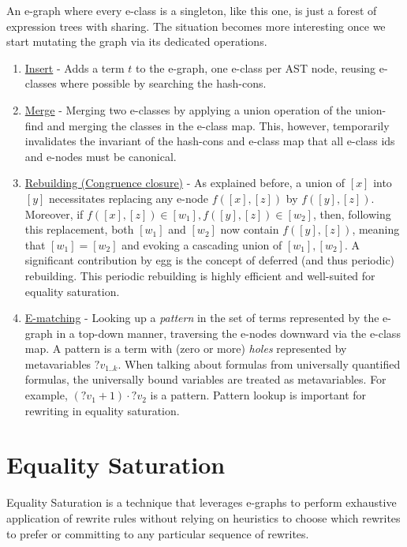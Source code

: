 An e-graph where every e-class is a singleton, like this one, is just a forest of expression trees with sharing.
The situation becomes more interesting once we start mutating the graph via its dedicated operations.

\begin{enumerate}
\item \underline{Insert} - Adds a term $t$ to the e-graph, one e-class per AST node, reusing e-classes where possible by searching the hash-cons.
\item \underline{Merge} - Merging two e-classes by applying a union operation of the union-find and merging the classes in the e-class map.
This, however, temporarily invalidates the invariant of the hash-cons and e-class map that all e-class ids and e-nodes must be canonical.
\item \underline{Rebuilding (Congruence closure)} - As explained before, a union of $[x]$ into $[y]$ necessitates replacing any e-node $f([x],[z])$ by $f([y],[z])$.
Moreover, if $f([x],[z])\in[w_1], f([y],[z])\in[w_2]$,
then, following this replacement, both $[w_1]$ and $[w_2]$ now contain
$f([y],[z])$, meaning that $[w_1] = [w_2]$ and evoking a cascading union of $[w_1], [w_2]$.
A significant contribution by egg is the concept of deferred (and thus periodic) rebuilding.
This periodic rebuilding is highly efficient and well-suited for equality saturation.
\item  \underline{E-matching} - Looking up a \emph{pattern} in the set of terms represented by the e-graph in a top-down manner, traversing the e-nodes downward via the e-class map.
A pattern is a term with (zero or more) \emph{holes} represented by metavariables $?v_{1..k}$.
When talking about formulas from universally quantified formulas, the universally bound variables are treated as metavariables.
For example, $(?v_1+1)\cdot ?v_2$ is a pattern.
Pattern lookup is important for rewriting in equality saturation.
\end{enumerate}

\section{Equality Saturation}

Equality Saturation is a technique that leverages e-graphs to perform exhaustive application of rewrite rules without relying on heuristics to choose which rewrites to prefer or committing to any particular sequence of rewrites.

